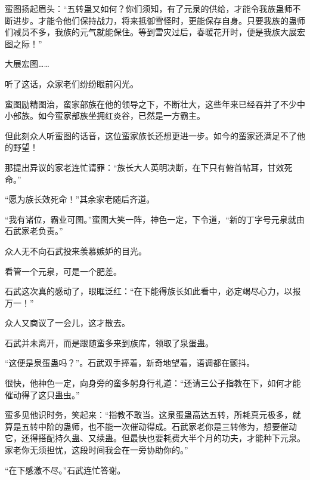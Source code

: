 \begin{this_body}
蛮图扬起眉头：“五转蛊又如何？你们须知，有了元泉的供给，才能令我族蛊师不断进步。才能令他们保持战力，将来抵御雪怪时，更能保存自身。只要我族的蛊师们减员不多，我族的元气就能保住。等到雪灾过后，春暖花开时，便是我族大展宏图之际！”

大展宏图……

听了这话，众家老们纷纷眼前闪光。

蛮图励精图治，蛮家部族在他的领导之下，不断壮大，这些年来已经吞并了不少中小部族。如今蛮家部族坐拥红炎谷，已然是一方霸主。

但此刻众人听蛮图的话音，这位蛮家族长还想更进一步。如今的蛮家还满足不了他的野望！

那提出异议的家老连忙请罪：“族长大人英明决断，在下只有俯首帖耳，甘效死命。”

“愿为族长效死命！”其余家老随后齐道。

“我有诸位，霸业可图。”蛮图大笑一阵，神色一定，下令道，“新的丁字号元泉就由石武家老负责。”

众人无不向石武投来羡慕嫉妒的目光。

看管一个元泉，可是一个肥差。

石武这次真的感动了，眼眶泛红：“在下能得族长如此看中，必定竭尽心力，以报万一！”

众人又商议了一会儿，这才散去。

石武并未离开，而是跟随蛮多来到族库，领取了泉蛋蛊。

“这便是泉蛋蛊吗？”。石武双手捧着，新奇地望着，语调都在颤抖。

很快，他神色一定，向身旁的蛮多躬身行礼道：“还请三公子指教在下，如何才能催动得了这只蛊虫。”

蛮多见他识时务，笑起来：“指教不敢当。这泉蛋蛊高达五转，所耗真元极多，就算是五转中阶的蛊师，也不能一次催动得成。石武家老你是三转修为，想要催动它，还得搭配持久蛊、又续蛊。但最快也要耗费大半个月的功夫，才能种下元泉。家老你无须担忧，这段时间我会在一旁协助你的。”

“在下感激不尽。”石武连忙答谢。

\end{this_body}

